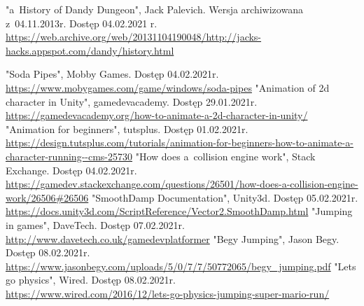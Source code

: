 \documentclass[oneside,polski,logo]{amuthesis}
\begin{document}
\begin{thebibliography}{100}
 "a~History of Dandy Dungeon", Jack Palevich. Wersja archiwizowana z~04.11.2013r. Dostęp 04.02.2021 r.
\\ \url{https://web.archive.org/web/20131104190048/http://jacks-hacks.appspot.com/dandy/history.html}

"Soda Pipes", Mobby Games. Dostęp 04.02.2021r.
\\ \url{https://www.mobygames.com/game/windows/soda-pipes}
"Animation of 2d character in Unity", gamedevacademy. Dostęp 29.01.2021r.
\\ \url{https://gamedevacademy.org/how-to-animate-a-2d-character-in-unity/}
"Animation for beginners", tutsplus. Dostęp 01.02.2021r.
\\ \url{https://design.tutsplus.com/tutorials/animation-for-beginners-how-to-animate-a-character-running--cms-25730}
"How does a~collision engine work", Stack Exchange. Dostęp 04.02.2021r.
\\ \url{https://gamedev.stackexchange.com/questions/26501/how-does-a-collision-engine-work/26506\#26506}
"SmoothDamp Documentation", Unity3d. Dostęp 05.02.2021r.
\\ \url{https://docs.unity3d.com/ScriptReference/Vector2.SmoothDamp.html}
"Jumping in games", DaveTech. Dostęp 07.02.2021r.
\\ \url{http://www.davetech.co.uk/gamedevplatformer}
"Begy Jumping", Jason Begy. Dostęp 08.02.2021r.
\\ \url{https://www.jasonbegy.com/uploads/5/0/7/7/50772065/begy\_jumping.pdf}
"Lets go physics", Wired. Dostęp 08.02.2021r.
\\ \url{https://www.wired.com/2016/12/lets-go-physics-jumping-super-mario-run/}
\end{thebibliography}
\end{document}
